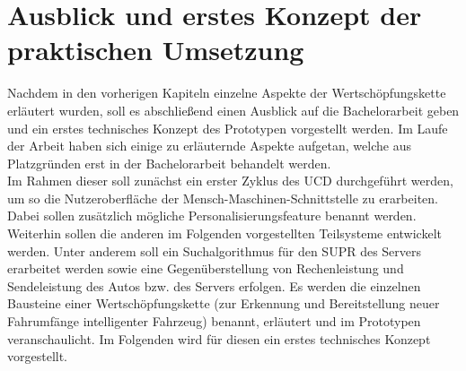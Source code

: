\section{Ausblick  und erstes Konzept der praktischen Umsetzung}
Nachdem in den vorherigen Kapiteln einzelne Aspekte der Wertschöpfungskette erläutert wurden, soll es abschließend einen Ausblick auf die Bachelorarbeit geben und ein erstes technisches Konzept des Prototypen vorgestellt werden. Im Laufe der Arbeit haben sich einige zu erläuternde Aspekte aufgetan, welche aus Platzgründen erst in der Bachelorarbeit behandelt werden.\\

Im Rahmen dieser soll zunächst ein erster Zyklus des UCD durchgeführt werden, um so die Nutzeroberfläche der Mensch-Maschinen-Schnittstelle zu erarbeiten. Dabei sollen zusätzlich mögliche Personalisierungsfeature benannt werden. Weiterhin sollen die anderen im Folgenden vorgestellten Teilsysteme entwickelt werden. Unter anderem soll ein Suchalgorithmus für den SUPR des Servers erarbeitet werden sowie eine Gegenüberstellung von Rechenleistung und Sendeleistung des Autos bzw. des Servers erfolgen. Es werden die einzelnen Bausteine einer Wertschöpfungskette (zur Erkennung
und Bereitstellung neuer Fahrumfänge intelligenter Fahrzeug) benannt, erläutert und im Prototypen veranschaulicht. Im Folgenden wird für diesen ein erstes technisches Konzept vorgestellt.\\

